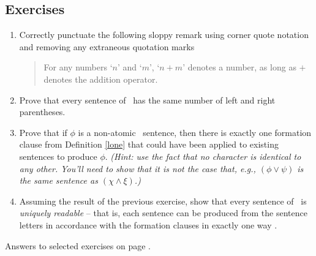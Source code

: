 	
	{\small


\subsection*{Exercises} \label{ex:l1syntax}


\begin{enumerate}
\item Correctly punctuate the following sloppy remark using corner quote notation and removing any extraneous quotation marks \begin{quote}
	For any numbers `$n$' and `$m$', `$n+m$' denotes a number, as long as $+$ denotes the addition operator.
\end{quote}
\item Prove that every sentence of \lone\ has the same number of left and right parentheses.
\item Prove that if $\phi$ is a non-atomic \lone\ sentence, then there is exactly one formation clause from Definition \ref{lone} that  could have been applied to existing sentences to produce $\phi$. \emph{(Hint: use the fact that no character is identical to any other. You'll need to show that it is not the case that, e.g., $(\phi \vee \psi)$ is the same sentence as $(\chi \wedge \xi)$.)}
\item Assuming the result of the previous exercise, show that every sentence of \lone\ is \emph{uniquely readable} – that is, each sentence can be produced from the sentence letters in accordance with the formation clauses in exactly one way \citep[\S 2]{sep-logic-classical}. 
	\end{enumerate}
	 
Answers to selected exercises on page \pageref{ans:l1syntax}.
}


